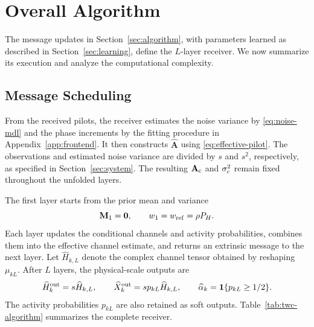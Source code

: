 \section{Overall Algorithm}
\label{sec:overall}

The message updates in Section~\ref{sec:algorithm}, with parameters
learned as described in Section~\ref{sec:learning}, define the
$L$-layer receiver. We now summarize its execution and analyze
the computational complexity.

\subsection{Message Scheduling}

From the received pilots, the receiver estimates the noise variance
by \eqref{eq:noise-mdl} and the phase increments by the fitting
procedure in Appendix~\ref{app:frontend}. It then constructs
$\widehat{\mathbf A}$ using \eqref{eq:effective-pilot}. The observations
and estimated noise variance are divided by $s$ and $s^2$,
respectively, as specified in Section~\ref{sec:system}. The resulting
$\mathbf A_{\rm c}$ and $\sigma_{\rm c}^2$ remain fixed throughout
the unfolded layers.

The first layer starts from the prior mean and variance
\begin{equation}
 \mathbf M_1=\mathbf0,\qquad w_1=w_{\rm ref}=\rho P_H.
 \label{eq:twc-initialization}
\end{equation}
Each layer updates the conditional channels and activity
probabilities, combines them into the effective channel estimate,
and returns an extrinsic message to the next layer. Let
$\widehat H_{k,L}$ denote the complex channel tensor obtained by
reshaping $\mu_{kL}$. After $L$ layers, the physical-scale outputs are
\begin{equation}
 \widehat H_k^{\rm out}=s\widehat H_{k,L},\qquad
 \widehat X_k^{\rm out}=s p_{kL}\widehat H_{k,L},\qquad
 \widehat\alpha_k=\mathbf1\{p_{kL}\geq1/2\}.
 \label{eq:twc-final-output}
\end{equation}
The activity probabilities $p_{kL}$ are also retained as soft outputs.
Table~\ref{tab:twc-algorithm} summarizes the complete receiver.

